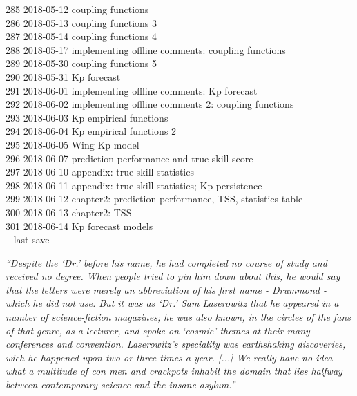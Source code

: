\begin{footnotesize}
285	2018-05-12	coupling functions\\
286	2018-05-13	coupling functions 3\\
287	2018-05-14	coupling functions 4\\
288	2018-05-17	implementing offline comments: coupling functions\\
289	2018-05-30	coupling functions 5\\
290	2018-05-31	Kp forecast\\
291	2018-06-01	implementing offline comments: Kp forecast\\
292	2018-06-02	implementing offline comments 2: coupling functions\\
293	2018-06-03	Kp empirical functions\\
294	2018-06-04	Kp empirical functions 2\\
295	2018-06-05	Wing Kp model\\
296	2018-06-07	prediction performance and true skill score\\
297	2018-06-10	appendix: true skill statistics\\
298	2018-06-11	appendix: true skill statistics; Kp persistence\\
299	2018-06-12	chapter2: prediction performance, TSS, statistics table\\
300	2018-06-13	chapter2: TSS\\
301	2018-06-14	Kp forecast models\\
\vspace{\baselineskip}
\ISOToday{} \thistime{} -- last save
\end{footnotesize}


\clearpage


\vspace*{\fill}


\noindent \textit{``Despite the `Dr.' before his name, he had completed no course of study and received no degree. When people tried to pin him down about this, he would say that the letters were merely an abbreviation of his first name - Drummond - which he did not use. But it was as `Dr.' Sam Laserowitz that he appeared in a number of science-fiction magazines; he was also known, in the circles of the fans of that genre, as a lecturer, and spoke on `cosmic' themes at their many conferences and convention. Laserowitz's speciality was earthshaking discoveries, wich he happened upon two or three times a year. [...] We really have no idea what a multitude of con men and crackpots inhabit the domain that lies halfway between contemporary science and the insane asylum.''}
\vspace{\baselineskip}

